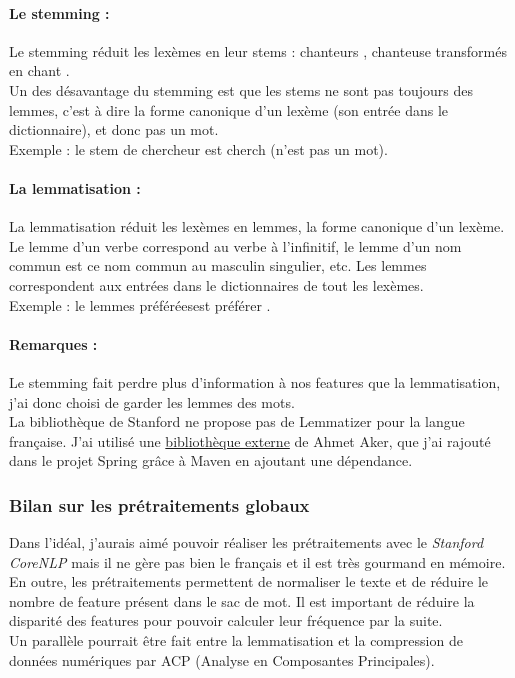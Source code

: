                 \paragraph{Le stemming :}
                    Le stemming réduit les lexèmes en leur stems : \og chanteurs \fg, \og chanteuse \fg transformés en \og chant \fg.\\
                    Un des désavantage du stemming est que les stems ne sont pas toujours des lemmes, c'est à dire la forme canonique d'un lexème (son entrée dans le dictionnaire), et donc pas un mot.\\
                    Exemple : le stem de \og chercheur \fg est \og cherch \fg (n'est pas un mot).

                \paragraph{La lemmatisation :}
                    La lemmatisation réduit les lexèmes en lemmes, la forme canonique d'un lexème. Le lemme d'un verbe correspond au verbe à l'infinitif, le lemme d'un nom commun est ce nom commun au masculin singulier, etc. Les lemmes correspondent aux entrées dans le dictionnaires de tout les lexèmes.\\
                    Exemple : le lemmes \og préférées\fg est \og préférer \fg.

                \paragraph{Remarques :}
                    Le stemming fait perdre plus d'information à nos features que la lemmatisation, j'ai donc choisi de garder les lemmes des mots.\\
                    La bibliothèque de Stanford ne propose pas de Lemmatizer pour la langue française. J'ai utilisé une \href{http://staffwww.dcs.shef.ac.uk/people/A.Aker/activityNLPProjects.html}{bibliothèque externe} de Ahmet Aker, que j'ai rajouté dans le projet Spring grâce à Maven en ajoutant une dépendance.

            \subsubsection{Bilan sur les prétraitements globaux}
                Dans l'idéal, j'aurais aimé pouvoir réaliser les prétraitements avec le \textit{Stanford CoreNLP} mais il ne gère pas bien le français et il est très gourmand en mémoire.\\
                En outre, les prétraitements permettent de normaliser le texte et de réduire le nombre de feature présent dans le sac de mot. Il est important de réduire la disparité des features pour pouvoir calculer leur fréquence par la suite.\\
                Un parallèle pourrait être fait entre la lemmatisation et la compression de données numériques par ACP (Analyse en Composantes Principales).

